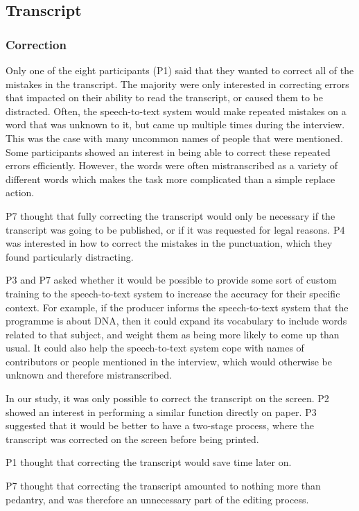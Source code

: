 \subsection{Transcript}

\subsubsection{Correction}

Only one of the eight participants (P1) said that they wanted to correct all of the mistakes in the transcript. The
majority were only interested in correcting errors that impacted on their ability to read the transcript, or caused
them to be distracted. Often, the speech-to-text system would make repeated mistakes on a word that was unknown to it,
but came up multiple times during the interview. This was the case with many uncommon names of people that were
mentioned. Some participants showed an interest in being able to correct these repeated errors efficiently. However,
the words were often mistranscribed as a variety of different words which makes the task more complicated than a simple
replace action.

P7 thought that fully correcting the transcript would only be necessary if the transcript was going to be published, or
if it was requested for legal reasons. P4 was interested in how to correct the mistakes in the punctuation, which they
found particularly distracting.

P3 and P7 asked whether it would be possible to provide some sort of custom training to the speech-to-text system to
increase the accuracy for their specific context. For example, if the producer informs the speech-to-text system that
the programme is about DNA, then it could expand its vocabulary to include words related to that subject, and weight
them as being more likely to come up than usual. It could also help the speech-to-text system cope with names of
contributors or people mentioned in the interview, which would otherwise be unknown and therefore mistranscribed.

In our study, it was only possible to correct the transcript on the screen. P2 showed an interest in performing a
similar function directly on paper. P3 suggested that it would be better to have a two-stage process, where the
transcript was corrected on the screen before being printed.

P1 thought that correcting the transcript would save time later on.

P7 thought that correcting the transcript amounted to nothing more than pedantry, and was therefore an unnecessary part
of the editing process.

